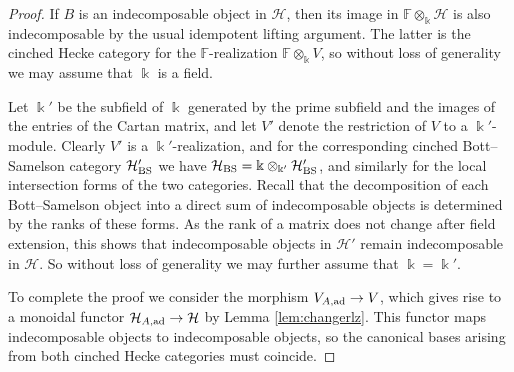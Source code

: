 \documentclass{amsart}
\theoremstyle{plain}
\newtheorem{cor}[thm]{Corollary}
\theoremstyle{definition}
\theoremstyle{remark}
\numberwithin{equation}{section}
\newcommand{\ZZ}{\mathbb{Z}}
\DeclareMathOperator{\End}{End}
\begin{document}
\begin{proof}
If $B$ is an indecomposable object in $\mathcal{H}$, then its image in $\mathbb{F} \otimes_{\Bbbk} \mathcal{H}$ is also indecomposable by the usual idempotent lifting argument.
The latter is the cinched Hecke category for the $\mathbb{F}$-realization $\mathbb{F} \otimes_{\Bbbk} V$, so without loss of generality we may assume that $\Bbbk$ is a field. 

Let $\Bbbk'$ be the subfield of $\Bbbk$ generated by the prime subfield and the images of the entries of the Cartan matrix, and let $V'$ denote the restriction of $V$ to a $\Bbbk'$-module. 
Clearly $V'$ is a $\Bbbk'$-realization, and for the corresponding cinched Bott--Samelson category $\mathcal{H}_{\rm BS}'$ we have $\mathcal{H}_{\rm BS}=\Bbbk \otimes_{\Bbbk'} \mathcal{H}'_{\rm BS}$, and similarly for the local intersection forms of the two categories. 
Recall that the decomposition of each Bott--Samelson object into a direct sum of indecomposable objects is determined by the ranks of these forms. 
As the rank of a matrix does not change after field extension, this shows that indecomposable objects in $\mathcal{H}'$ remain indecomposable in $\mathcal{H}$.
So without loss of generality we may further assume that $\Bbbk=\Bbbk'$.

To complete the proof we consider the morphism $V_{A,{\rm ad}} \rightarrow V$, which gives rise to a monoidal functor $\mathcal{H}_{A,{\rm ad}} \rightarrow \mathcal{H}$ by Lemma \ref{lem:changerlz}.
This functor maps indecomposable objects to indecomposable objects, so the canonical bases arising from both cinched Hecke categories must coincide.
\end{proof}

%
\end{document}
